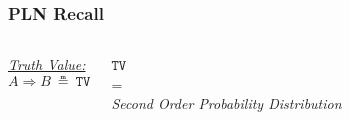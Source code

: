 \documentclass[aspectratio=169]{beamer}
\newcommand{\limp}{\Rightarrow}
\begin{document}
\begin{frame}
  \frametitle{PLN Recall}
  \begin{columns}
    \column{5cm}
    \underline{\emph{Truth Value:}}
    $$A \limp B\ \measeq\ \texttt{TV}$$
    \begin{center}
      $\texttt{TV}$\\
      =\\
      \emph{Second Order Probability Distribution}
    \end{center}
    \column{10cm}
  \end{columns}
\end{frame}
\end{document}
